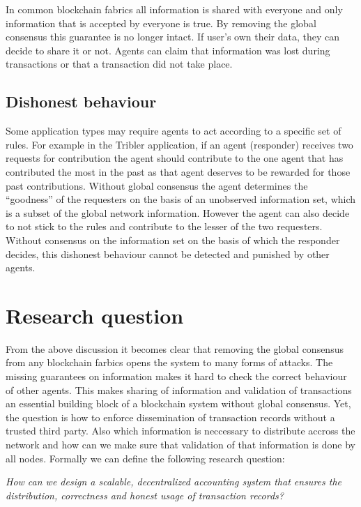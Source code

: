 In common blockchain fabrics all information is shared with everyone and only information that is 
accepted by everyone is true. By removing the global consensus this guarantee is no longer intact.
If user's own their data, they can decide to share it or not. Agents can claim that information was
lost during transactions or that a transaction did not take place.

\subsection{Dishonest behaviour}
Some application types may require agents to act according to a specific set of rules. For example
in the Tribler application, if an agent (responder) receives two requests for contribution the 
agent should contribute to the one agent that has contributed the most in the past as that agent 
deserves to be rewarded for those past contributions. Without global consensus the agent determines
the ``goodness'' of the requesters on the basis of an unobserved information set, which is a subset
of the global network information. However the agent can also decide to not stick to the rules and
contribute to the lesser of the two requesters. Without consensus on the information set on the 
basis of which the responder decides, this dishonest behaviour cannot be detected and punished by
other agents.

\section{Research question}
From the above discussion it becomes clear that removing the global consensus from any blockchain
farbics opens the system to many forms of attacks. The missing guarantees on information makes it
hard to check the correct behaviour of other agents. This makes sharing of information and 
validation of transactions an essential building block of a blockchain system without global
consensus. Yet, the question is how to enforce dissemination of transaction records without a
trusted third party. Also which information is neccessary to distribute accross the network and how
can we make sure that validation of that information is done by all nodes. Formally we can define 
the following research question:

\begin{center}
    \textit{How can we design a scalable, decentralized accounting system that ensures the distribution,
    correctness and honest usage of transaction records?}
\end{center}

